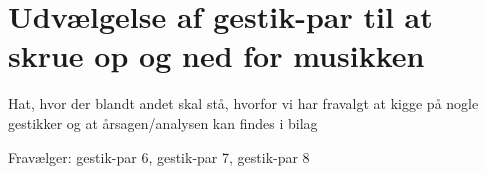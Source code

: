 \section{Udvælgelse af gestik-par til at skrue op og ned for musikken}
\label{TestresultaterVolumen}
%
Hat, hvor der blandt andet skal stå, hvorfor vi har fravalgt at kigge på nogle gestikker og at årsagen/analysen kan findes i bilag 


Fravælger: gestik-par 6, gestik-par 7, gestik-par 8